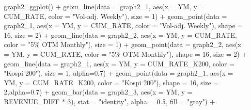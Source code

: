 \documentclass[
  a4paper,
  DIV=11,
  numbers=noendperiod]{scrreprt}
\newenvironment{Shaded}{\begin{snugshade}}{\end{snugshade}}
\newcommand{\AttributeTok}[1]{\textcolor[rgb]{0.40,0.45,0.13}{#1}}
\newcommand{\DecValTok}[1]{\textcolor[rgb]{0.68,0.00,0.00}{#1}}
\newcommand{\FloatTok}[1]{\textcolor[rgb]{0.68,0.00,0.00}{#1}}
\newcommand{\FunctionTok}[1]{\textcolor[rgb]{0.28,0.35,0.67}{#1}}
\newcommand{\NormalTok}[1]{\textcolor[rgb]{0.00,0.23,0.31}{#1}}
\newcommand{\OtherTok}[1]{\textcolor[rgb]{0.00,0.23,0.31}{#1}}
\newcommand{\SpecialCharTok}[1]{\textcolor[rgb]{0.37,0.37,0.37}{#1}}
\newcommand{\StringTok}[1]{\textcolor[rgb]{0.13,0.47,0.30}{#1}}
\begin{document}
\begin{Shaded}
\begin{Highlighting}[]
\NormalTok{graph2}\OtherTok{=}\FunctionTok{ggplot}\NormalTok{() }\SpecialCharTok{+}
  \FunctionTok{geom\_line}\NormalTok{(}\AttributeTok{data =}\NormalTok{ graph2\_1, }\FunctionTok{aes}\NormalTok{(}\AttributeTok{x =}\NormalTok{ YM, }\AttributeTok{y =}\NormalTok{ CUM\_RATE, }\AttributeTok{color =} \StringTok{"Vol{-}adj. Weekly"}\NormalTok{), }\AttributeTok{size =} \DecValTok{1}\NormalTok{) }\SpecialCharTok{+}
  \FunctionTok{geom\_point}\NormalTok{(}\AttributeTok{data =}\NormalTok{ graph2\_1, }\FunctionTok{aes}\NormalTok{(}\AttributeTok{x =}\NormalTok{ YM, }\AttributeTok{y =}\NormalTok{ CUM\_RATE, }\AttributeTok{color =} \StringTok{"Vol{-}adj. Weekly"}\NormalTok{), }\AttributeTok{shape =} \DecValTok{16}\NormalTok{, }\AttributeTok{size =} \DecValTok{2}\NormalTok{) }\SpecialCharTok{+}
  \FunctionTok{geom\_line}\NormalTok{(}\AttributeTok{data =}\NormalTok{ graph2\_2, }\FunctionTok{aes}\NormalTok{(}\AttributeTok{x =}\NormalTok{ YM, }\AttributeTok{y =}\NormalTok{ CUM\_RATE, }\AttributeTok{color =} \StringTok{"5\% OTM Monthly"}\NormalTok{), }\AttributeTok{size =} \DecValTok{1}\NormalTok{) }\SpecialCharTok{+}
  \FunctionTok{geom\_point}\NormalTok{(}\AttributeTok{data =}\NormalTok{ graph2\_2, }\FunctionTok{aes}\NormalTok{(}\AttributeTok{x =}\NormalTok{ YM, }\AttributeTok{y =}\NormalTok{ CUM\_RATE, }\AttributeTok{color =} \StringTok{"5\% OTM Monthly"}\NormalTok{), }\AttributeTok{shape =} \DecValTok{16}\NormalTok{, }\AttributeTok{size =} \DecValTok{2}\NormalTok{) }\SpecialCharTok{+}
  \FunctionTok{geom\_line}\NormalTok{(}\AttributeTok{data =}\NormalTok{ graph2\_1, }\FunctionTok{aes}\NormalTok{(}\AttributeTok{x =}\NormalTok{ YM, }\AttributeTok{y =}\NormalTok{ CUM\_RATE\_K200, }\AttributeTok{color =} \StringTok{"Kospi 200"}\NormalTok{), }\AttributeTok{size =} \DecValTok{1}\NormalTok{, }\AttributeTok{alpha=}\FloatTok{0.7}\NormalTok{) }\SpecialCharTok{+}
  \FunctionTok{geom\_point}\NormalTok{(}\AttributeTok{data =}\NormalTok{ graph2\_1, }\FunctionTok{aes}\NormalTok{(}\AttributeTok{x =}\NormalTok{ YM, }\AttributeTok{y =}\NormalTok{ CUM\_RATE\_K200, }\AttributeTok{color =} \StringTok{"Kospi 200"}\NormalTok{), }\AttributeTok{shape =} \DecValTok{16}\NormalTok{, }\AttributeTok{size =} \DecValTok{2}\NormalTok{,}\AttributeTok{alpha=}\FloatTok{0.7}\NormalTok{) }\SpecialCharTok{+}
  \FunctionTok{geom\_bar}\NormalTok{(}\AttributeTok{data =}\NormalTok{ graph2\_3, }\FunctionTok{aes}\NormalTok{(}\AttributeTok{x =}\NormalTok{ YM, }\AttributeTok{y =}\NormalTok{ REVENUE\_DIFF }\SpecialCharTok{*} \DecValTok{3}\NormalTok{),}
           \AttributeTok{stat =} \StringTok{"identity"}\NormalTok{, }\AttributeTok{alpha =} \FloatTok{0.5}\NormalTok{, }\AttributeTok{fill =} \StringTok{"gray"}\NormalTok{) }\SpecialCharTok{+}

\end{Highlighting}
\end{Shaded}
\end{document}

